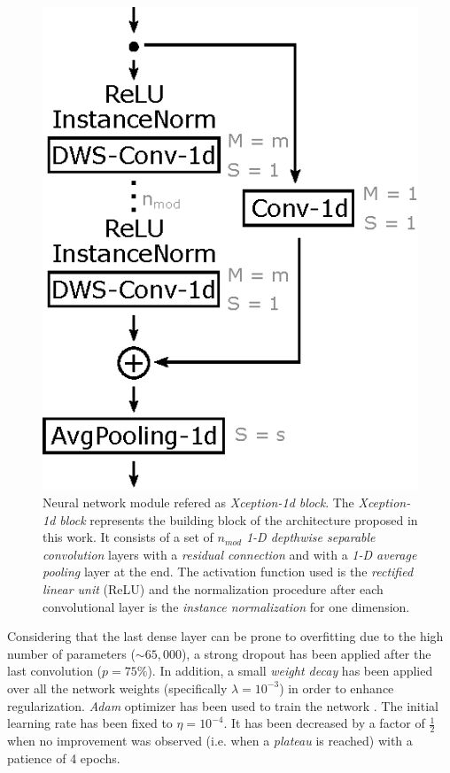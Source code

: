 \documentclass{elsarticle}
\begin{document}
\begin{figure}[ht]
	\centering
	\includegraphics[width=0.4\linewidth]{img/xception_module.eps}
	\caption{Neural network module refered as \textit{Xception-1d block}. The \textit{Xception-1d block} represents the building block of the architecture proposed in this work. It consists of a set of $n_{mod}$ \textit{1-D depthwise separable convolution} layers with a \textit{residual connection} and with a \textit{1-D average pooling} layer at the end. The activation function used is the \textit{rectified linear unit} (ReLU) and the normalization procedure after each convolutional layer is the \textit{instance normalization} for one dimension.}
	\label{fig:xceptionmodule}
\end{figure}



Considering that the last dense layer can be prone to overfitting due to the high number of parameters ($\sim 65,000$), a strong dropout \cite{Srivastava2014, Goodfellow2016} has been applied after the last convolution ($p = 75\%$). In addition, a small \textit{weight decay} \cite{Krogh1991, Haykin1998, Goodfellow2016} has been applied over all the network weights (specifically $\lambda = 10^{-3}$) in order to enhance regularization. \textit{Adam} optimizer has been used to train the network \cite{Kingma14}. The initial learning rate has been fixed to $\eta = 10^{-4}$. It has been decreased by a factor of $\frac{1}{2}$ when no improvement was observed (i.e. when a \textit{plateau} is reached) with a patience of 4 epochs.
\end{document}
